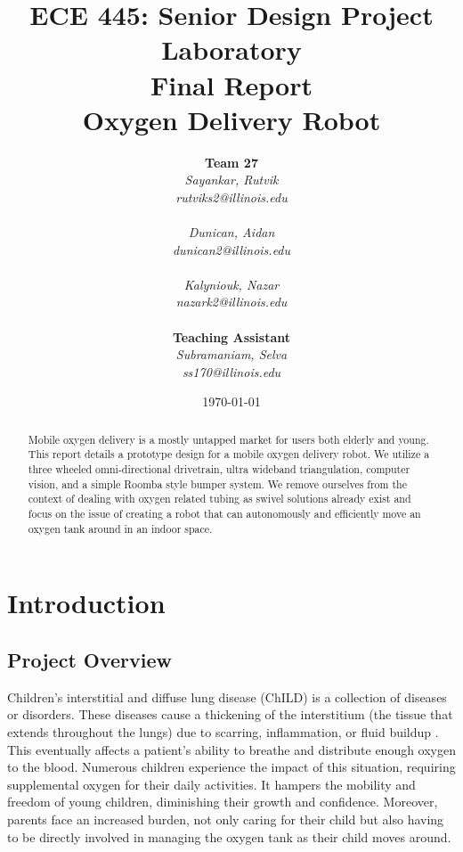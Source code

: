 \documentclass{report}
\title{ECE 445: Senior Design Project Laboratory \\ Final Report \\ Oxygen Delivery Robot} %
\author {
    \textbf{Team 27} \\ 
    \textit{Sayankar, Rutvik}\\
    \textit{rutviks2@illinois.edu} \\
    \hfill \\ 
    \textit{Dunican, Aidan}\\
    \textit{dunican2@illinois.edu} \\
    \hfill \\ 
    \textit{Kalyniouk, Nazar}\\
    \textit{nazark2@illinois.edu} \\
    \hfill \\ 
    \textbf{Teaching Assistant} \\ 
    \textit{Subramaniam, Selva} \\
    \textit{ss170@illinois.edu} 
}
\date{\today} %
\begin{document}
    \maketitle %

    \begin{abstract}
        Mobile oxygen delivery is a mostly untapped market for users both elderly and young. This report details a prototype design for a mobile oxygen delivery robot. We utilize a three wheeled omni-directional drivetrain, ultra wideband triangulation, computer vision, and a simple Roomba style bumper system. We remove ourselves from the context of dealing with oxygen related tubing as swivel solutions already exist and focus on the issue of creating a robot that can autonomously and efficiently move an oxygen tank around in an indoor space.
    \end{abstract}
    
    \pagebreak
    \tableofcontents %
    \pagebreak

    \chapter{Introduction}
    \section{Project Overview}
    Children's interstitial and diffuse lung disease (ChILD) is a collection of diseases or disorders. These diseases cause a thickening of the interstitium (the tissue that extends throughout the lungs) due to scarring, inflammation, or fluid buildup \cite{ChILD-2022}. This eventually affects a patient’s ability to breathe and distribute enough oxygen to the blood. Numerous children experience the impact of this situation, requiring supplemental oxygen for their daily activities. It hampers the mobility and freedom of young children, diminishing their growth and confidence. Moreover, parents face an increased burden, not only caring for their child but also having to be directly involved in managing the oxygen tank as their child moves around.
\end{document}
